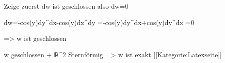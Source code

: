 Zeige zuerst dw ist geschlossen also dw=0

dw=-cos(y)dy^dx-cos(y)dx^dy
  =-cos(y)dy^dx+cos(y)dy^dx
  =0

=> w ist geschlossen

w geschlossen + ℝ^2 Sternförmig
=> w ist exakt [[Kategorie:Latexseite]]
